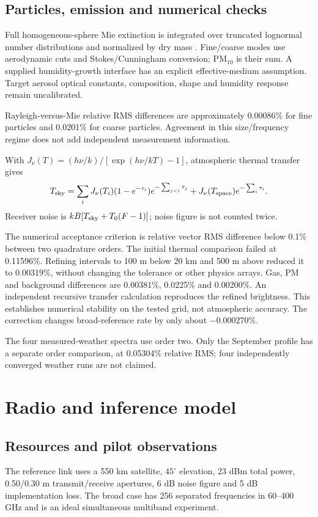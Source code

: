 \documentclass[conference]{IEEEtran}
\begin{document}
\subsection{Particles, emission and numerical checks}
Full homogeneous-sphere Mie extinction is integrated over truncated lognormal number distributions and normalized by dry mass \cite{mie}. Fine/coarse modes use aerodynamic cuts and Stokes/Cunningham conversion; PM$_{10}$ is their sum. A supplied humidity-growth interface has an explicit effective-medium assumption. Target aerosol optical constants, composition, shape and humidity response remain uncalibrated.

Rayleigh-versus-Mie relative RMS differences are approximately 0.00086\% for fine particles and 0.0201\% for coarse particles. Agreement in this size/frequency regime does not add independent measurement information.

With $J_\nu(T)=(h\nu/k)/[\exp(h\nu/kT)-1]$, atmospheric thermal transfer gives
\begin{equation}
T_{\rm sky}=\sum_iJ_\nu(T_i)(1-e^{-\tau_i})e^{-\sum_{j<i}\tau_j}
+J_\nu(T_{\rm space})e^{-\sum_i\tau_i}.
\end{equation}
Receiver noise is $kB[T_{\rm sky}+T_0(F-1)]$; noise figure is not counted twice.

The numerical acceptance criterion is relative vector RMS difference below 0.1\% between two quadrature orders. The initial thermal comparison failed at 0.11596\%. Refining intervals to 100 m below 20 km and 500 m above reduced it to 0.00319\%, without changing the tolerance or other physics arrays. Gas, PM and background differences are 0.00381\%, 0.0225\% and 0.00200\%. An independent recursive transfer calculation reproduces the refined brightness. This establishes numerical stability on the tested grid, not atmospheric accuracy. The correction changes broad-reference rate by only about $-0.000270\%$.

The four measured-weather spectra use order two. Only the September profile has a separate order comparison, at 0.05304\% relative RMS; four independently converged weather runs are not claimed.

\section{Radio and inference model}
\subsection{Resources and pilot observations}
The reference link uses a 550 km satellite, $45^\circ$ elevation, 23 dBm total power, 0.50/0.30 m transmit/receive apertures, 6 dB noise figure and 5 dB implementation loss. The broad case has 256 separated frequencies in 60--400 GHz and is an ideal simultaneous multiband experiment.
\end{document}
